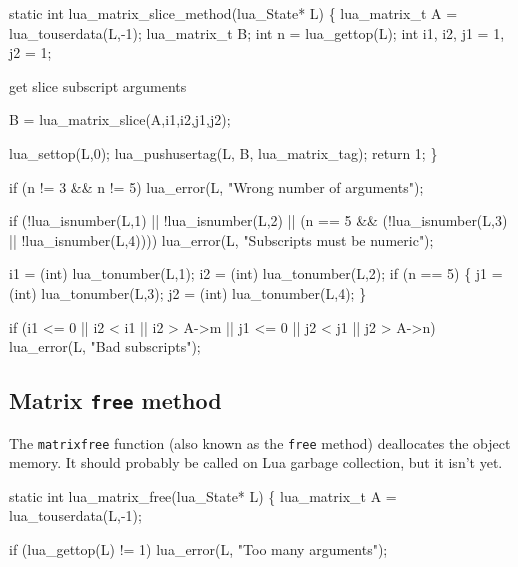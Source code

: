 \nwenddocs{}\plusendmoddef
static int lua_matrix_slice_method(lua_State* L)
\{
    lua_matrix_t A = lua_touserdata(L,-1);
    lua_matrix_t B;
    int n = lua_gettop(L);
    int i1, i2, j1 = 1, j2 = 1;

    \LA{}get slice subscript arguments~{\nwtagstyle{}}\RA{}

    B = lua_matrix_slice(A,i1,i2,j1,j2);

    lua_settop(L,0);
    lua_pushusertag(L, B, lua_matrix_tag);
    return 1;
\}

\nwendcode{}\nwdocspar

\nwenddocs{}\endmoddef
if (n != 3 && n != 5)
    lua_error(L, "Wrong number of arguments");

if (!lua_isnumber(L,1) || !lua_isnumber(L,2) ||
    (n == 5 && (!lua_isnumber(L,3) || !lua_isnumber(L,4))))
    lua_error(L, "Subscripts must be numeric");

i1 = (int) lua_tonumber(L,1);
i2 = (int) lua_tonumber(L,2);
if (n == 5) \{
    j1 = (int) lua_tonumber(L,3);
    j2 = (int) lua_tonumber(L,4);
\}

if (i1 <= 0 || i2 < i1 || i2 > A->m ||
    j1 <= 0 || j2 < j1 || j2 > A->n)
    lua_error(L, "Bad subscripts");

\nwendcode{}\nwdocspar

\subsection{Matrix {\tt{}free} method}

The {\tt{}matrix{}free} function (also known as the {\tt{}free} method)
deallocates the object memory.  It should probably be called on
Lua garbage collection, but it isn't yet.

\nwenddocs{}\plusendmoddef
static int lua_matrix_free(lua_State* L)
\{
    lua_matrix_t A = lua_touserdata(L,-1);

    if (lua_gettop(L) != 1)
        lua_error(L, "Too many arguments");

